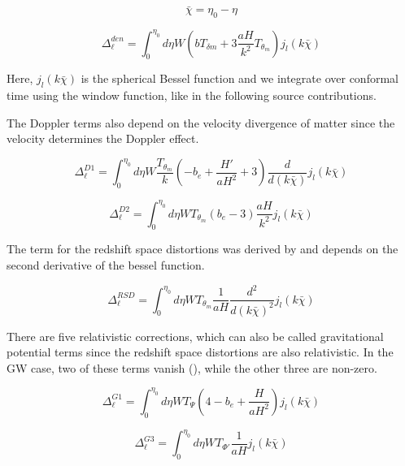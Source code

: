 \begin{equation}
    \bar{\chi} = \eta_0 - \eta 
\end{equation}


\begin{equation}
    \Delta_\ell^{den}=\int_0^{\eta_0} d\eta W \left(b T_{\delta m} +3 \frac{aH}{k^2} T_{\theta_m}\right)j_l(k \bar{\chi})
\end{equation}

Here, $j_l(k \bar{\chi})$ is the spherical Bessel function and we integrate over conformal time using the window function, like in the following source contributions.

The Doppler terms also depend on the velocity divergence of matter since the velocity determines the Doppler effect.

\begin{equation}
    \Delta_\ell^{D1}=\int_0^{\eta_0} d\eta W \frac{T_{\theta_m}}{k} \left(-b_e + \frac{H'}{aH^2}+3\right)\frac{d}{d(k\bar{\chi})} j_l(k \bar{\chi})
\end{equation}

\begin{equation}
    \Delta_\ell^{D2}=\int_0^{\eta_0} d\eta W T_{\theta_m}(b_e-3) \frac{aH}{k^2} j_l(k \bar{\chi})
\end{equation}

The term for the redshift space distortions was derived by \cite{kaiser_clustering_1987} and depends on the second derivative of the bessel function.

\begin{equation}
    \Delta_\ell^{RSD}=\int_0^{\eta_0} d\eta W T_{\theta_m} \frac{1}{aH}\frac{d^2}{d(k\bar{\chi})^2} j_l(k \bar{\chi})
\end{equation}

There are five relativistic corrections, which can also be called gravitational potential terms since the redshift space distortions are also relativistic. In the GW case, two of these terms vanish (\cite{dallarmi_dipole_2022}), while the other three are non-zero.

\begin{equation}
    \Delta_\ell^{G1}=\int_0^{\eta_0} d\eta W T_\Psi \left(4-b_e+\frac{H}{aH^2}\right) j_l(k \bar{\chi})
\end{equation}

\begin{equation}
    \Delta_\ell^{G3}=\int_0^{\eta_0} d\eta W T_{\Phi'} \frac{1}{aH} j_l(k \bar{\chi})
\end{equation}

